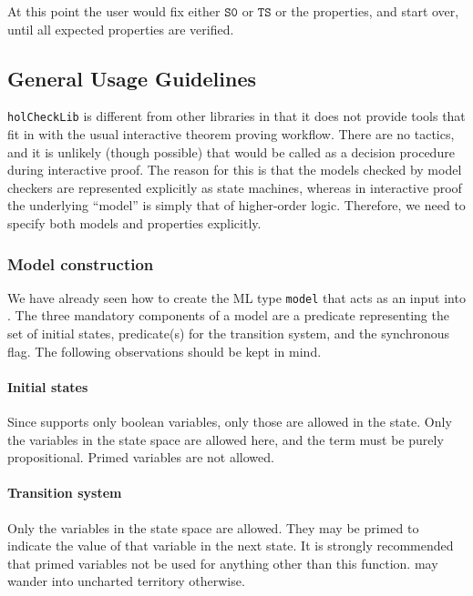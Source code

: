 At this point the user would fix either \(\mathtt{S0}\) or \(\mathtt{TS}\) or the properties, and start over, until all expected properties are verified.

\subsection{General Usage Guidelines}

\texttt{holCheckLib} is different from other libraries in that it does not provide tools that fit in with the usual interactive theorem proving workflow. There are no tactics, and it is unlikely (though possible) that \hc{} would be called as a decision procedure during interactive proof. The reason for this is that the models checked by model checkers are represented explicitly as state machines, whereas in \HOL{} interactive proof the underlying ``model'' is simply that of higher-order logic.  Therefore, we need to specify both models and properties explicitly.

\subsubsection{Model construction}\label{sec:models}

We have already seen how to create the ML type \texttt{model} that acts as an input into \hc{}. The three mandatory components of a model are a predicate representing the set of initial states, predicate(s) for the transition system, and the synchronous flag. The following observations should be kept in mind.

\paragraph{Initial states}

Since \hc{} supports only boolean variables, only those are allowed in the state. Only the variables in the state space are allowed here, and the term must be purely propositional. Primed variables are not allowed.

\paragraph{Transition system}

Only the variables in the state space are allowed. They may be primed to indicate the value of that variable in the next state. It is strongly recommended that primed variables not be used for anything other than this function. \hc{} may wander into uncharted territory otherwise.

